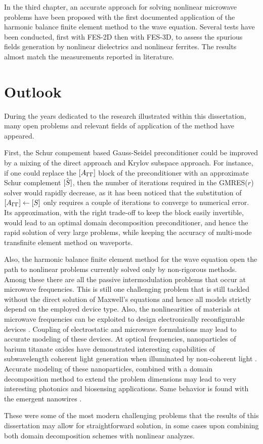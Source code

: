 In the third chapter, an accurate approach for solving nonlinear microwave problems have been proposed with the first documented application of the harmonic balance finite element method to the wave equation. Several tests have been conducted, first with FES-2D then with FES-3D, to assess the spurious fields generation by nonlinear dielectrics and nonlinear ferrites. The results almost match the measurements reported in literature.

\section{Outlook}

During the years dedicated to the research illustrated within this dissertation, many open problems and relevant fields of application of the method have appeared.

First, the Schur compement based Gauss-Seidel preconditioner could be improved by a mixing of the direct approach and Krylov subspace approach. For instance, if one could replace the $\left[A_{\Gamma\Gamma}\right]$ block of the preconditioner with an approximate Schur complement $\tilde{\left[S\right]}$, then the number of iterations required in the GMRES($r$) solver would rapidly decrease, as it has been noticed that the substitution of $\left[A_{\Gamma\Gamma}\right] \leftarrow \left[S\right]$ only requires a couple of iterations to converge to numerical error. Its approximation, with the right trade-off to keep the block easily invertible, would lead to an optimal domain decomposition preconditioner, and hence the rapid solution of very large problems, while keeping the accuracy of multi-mode transfinite element method on waveports.

Also, the harmonic balance finite element method for the wave equation open the path to nonlinear problems currently solved only by non-rigorous methods. Among these there are all the passive intermodulation problems that occur at microwave frequencies. This is still one challenging problem that is still tackled without the direct solution of Maxwell's equations \cite{henrie2008prediction,lin2014design} and hence all models strictly depend on the employed device type. Also, the nonlinearities of materials at microwave frequencies can be exploited to design electronically reconfigurable devices \cite{Sigman2008, Zhang2008, Delprat2011}. Coupling of electrostatic and microwave formulations may lead to accurate modeling of these devices. At optical frequencies, nanoparticles of barium titanate oxides have demonstrated interesting capabilities of subwavelength coherent light generation when illuminated by non-coherent light \cite{pu2010nonlinear}. Accurate modeling of these nanoparticles, combined with a domain decomposition method to extend the problem dimensions may lead to very interesting photonics and biosensing applications. Same behavior is found with the emergent nanowires \cite{dutto2011nonlinear}.

These were some of the most modern challenging problems that the results of this dissertation may allow for straightforward solution, in some cases upon combining both domain decomposition schemes with nonlinear analyzes.